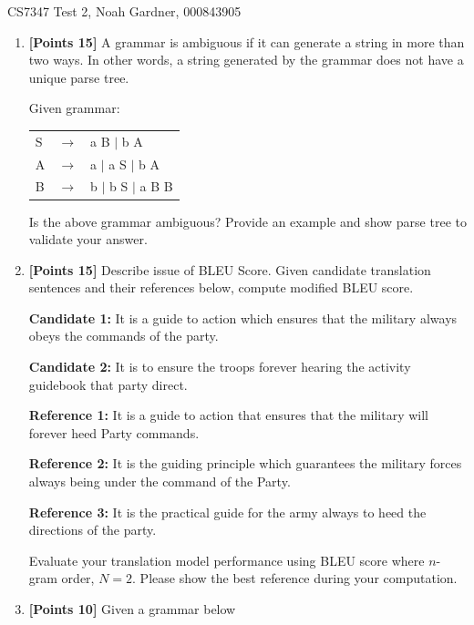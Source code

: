 \documentclass[12pt]{article}
\newcommand\n{\newline}
\begin{document}
CS7347 Test 2, Noah Gardner, 000843905\n

\begin{enumerate}
      \item \textbf{[Points 15]} A grammar is ambiguous if it can generate a
            string in more than two ways. In other words, a string generated by the
            grammar does not have a unique parse tree.

            Given grammar:

            \begin{tabular}{lll}
                  S & $\rightarrow$ & a B $|$ b A         \\
                  A & $\rightarrow$ & a $|$ a S $|$ b A   \\
                  B & $\rightarrow$ & b $|$ b S $|$ a B B \\
            \end{tabular}

            Is the above grammar ambiguous? Provide an example and show parse tree
            to validate your answer.
      \item \textbf{[Points 15]} Describe issue of BLEU Score. Given candidate
            translation sentences and their references below, compute modified BLEU
            score.

            \textbf{Candidate 1:} It is a guide to action which ensures that the
            military always obeys the commands of the party.

            \textbf{Candidate 2:} It is to ensure the troops forever hearing the
            activity guidebook that party direct.

            \textbf{Reference 1:} It is a guide to action that ensures that the
            military will forever heed Party commands.

            \textbf{Reference 2:} It is the guiding principle which guarantees
            the military forces always being under the command of the Party.

            \textbf{Reference 3:} It is the practical guide for the army always to
            heed the directions of the party.

            Evaluate your translation model performance using BLEU score where
            $n$-gram order, $N=2$. Please show the best reference during your
            computation.
      \item \textbf{[Points 10]} Given a grammar below


\end{enumerate}
\end{document}
